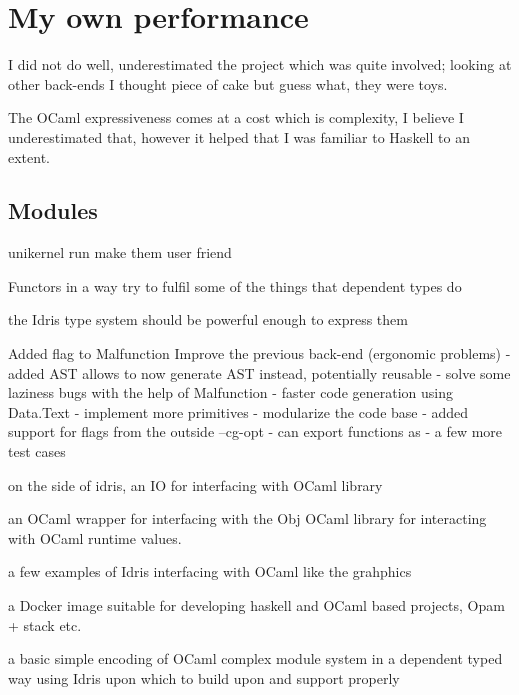 

\section{My own performance}
I did not do well, underestimated the project
which was quite involved; looking at other back-ends 
I thought piece of cake but guess what, they were
toys. 

The OCaml expressiveness comes at a cost which is complexity,
I believe I underestimated that, however it helped that
I was familiar to Haskell to an extent. 


\subsection{Modules}
unikernel run
make them user friend

Functors in a way try to fulfil some of the things that
dependent types do


the Idris type system should be powerful enough to express them

Added flag to Malfunction
Improve the previous back-end  (ergonomic problems)
- added AST allows to now generate AST instead, potentially reusable
- solve some laziness bugs with the help of Malfunction
- faster code generation using Data.Text
- implement more primitives
- modularize the code base
- added support for flags from the outside --cg-opt
- can export functions as
- a few more test cases

on the side of idris, an IO for interfacing with OCaml library

an OCaml wrapper for interfacing with the Obj OCaml library for
interacting with OCaml runtime values.

a few examples of Idris interfacing with OCaml like the
grahphics

a Docker image suitable for developing haskell and OCaml
based projects, Opam + stack etc.

a basic simple encoding of OCaml complex module system in
a dependent typed way using Idris upon which to build
upon and support properly
